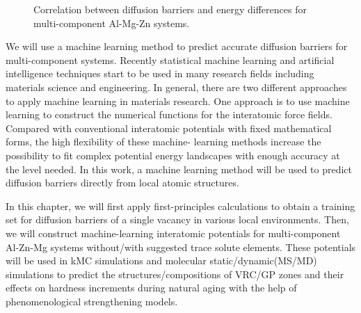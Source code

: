 \begingroup
\begin{figure}[!ht]
  \centering
\caption[Correlation between diffusion barriers and energy differences for multi-component Al-Mg-Zn systems]{Correlation between diffusion barriers and energy differences for multi-component Al-Mg-Zn systems.}
  \label{Chap:Al/Vac:fig2}
\end{figure}
\endgroup


We will use a machine learning method to predict accurate diffusion barriers for multi-component systems. Recently statistical machine learning and artificial intelligence techniques start to be used in many research fields including materials science and engineering. In general, there are two different approaches to apply machine learning in materials research. One approach is to use machine learning to construct the numerical functions for the interatomic force fields. \cite{bartok2010gaussian,behler2011atom,szlachta2014accuracy,artrith2016implementation,mehta2014exact,artrith2017efficient} Compared with conventional interatomic potentials with fixed mathematical forms, the high flexibility of these machine- learning methods increase the possibility to fit complex potential energy landscapes with enough accuracy at the level needed. In this work, a machine learning method will be used to predict diffusion barriers directly from local atomic structures.


In this chapter, we will first apply first-principles calculations to obtain a training set for diffusion barriers of a single vacancy in various local environments. Then, we will construct machine-learning interatomic potentials for multi-component Al-Zn-Mg systems without/with suggested trace solute elements. These potentials will be used in \ac{kMC} simulations and molecular static/dynamic(MS/MD) simulations to predict the structures/compositions of \ac{VRC}/\ac{GP} zones and their effects on hardness increments during natural aging with the help of phenomenological strengthening models.